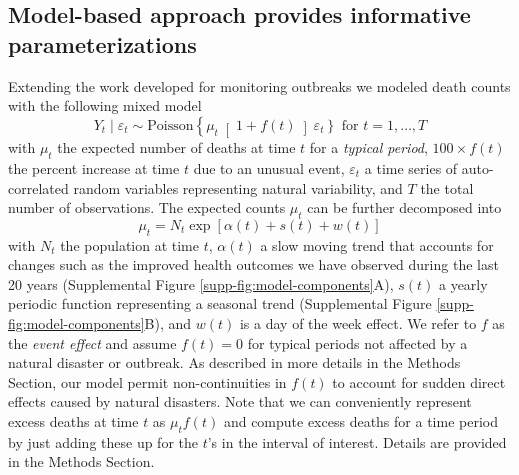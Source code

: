 \documentclass[11pt]{article}
\begin{document}
\subsection{Model-based approach provides informative parameterizations}
\label{subsec:model-based}
Extending the work developed for monitoring outbreaks \cite{farrington1996statistical,hohle2008count,noufaily2013improved,salmon2016monitoring} we modeled death counts with the following mixed model
\begin{equation}
    Y_t \mid \varepsilon_t \sim 
    \mbox{Poisson}\left\{ \mu_t \right[1 + f(t) \left]  \varepsilon_t \right\} \mbox{ for } t = 1, \dots,T
\end{equation}
with $\mu_t$ the expected number of deaths at time $t$ for a \emph{typical period}, $100 \times f(t)$ the percent increase at time $t$ due to an unusual event, $\varepsilon_t$ a time series of auto-correlated random variables representing natural variability, and $T$ the total number of observations. The expected counts $\mu_t$ can be further decomposed into 
\begin{equation}
    \mu_t =N_t \exp[\alpha(t) + s(t) + w(t)]
    \label{eq:mean-model}
\end{equation}
with $N_t$ the population at time $t$, $\alpha(t)$ a slow moving trend that accounts for changes such as the improved health outcomes we have observed during the last 20 years (Supplemental Figure \ref{supp-fig:model-components}A), $s(t)$ a yearly periodic function representing a seasonal trend (Supplemental Figure \ref{supp-fig:model-components}B), and $w(t)$ is a day of the week effect. We refer to $f$ as the \emph{event effect} and assume $f(t) = 0$ for typical periods not affected by a natural disaster or outbreak. As described in more details in the Methods Section, our model permit non-continuities in $f(t)$ to account for sudden direct effects caused by natural disasters. Note that we can conveniently represent excess deaths at time $t$ as $\mu_t f(t)$ and compute excess deaths for a time period by just adding these up for the $t$'s in the interval of interest. 
Details are provided in the Methods Section.
\end{document}
